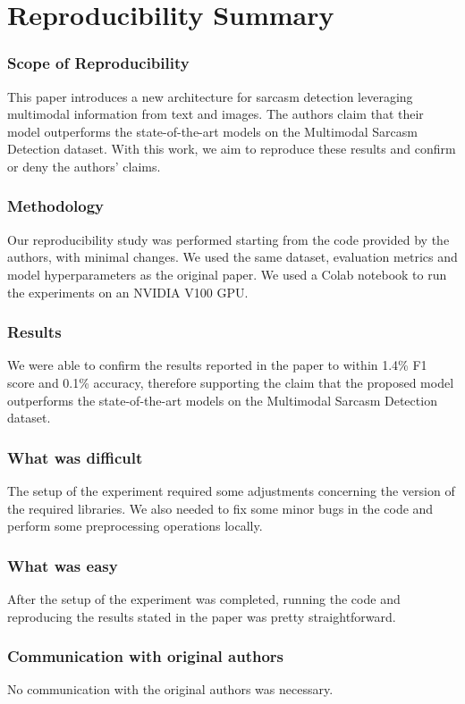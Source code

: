 \section*{\centering Reproducibility Summary}

\subsubsection*{Scope of Reproducibility}
This paper introduces a new architecture for sarcasm detection leveraging multimodal information from text and images. The authors claim that their model outperforms the state-of-the-art models on the Multimodal Sarcasm Detection dataset. With this work, we aim to reproduce these results and confirm or deny the authors' claims.

\subsubsection*{Methodology}
Our reproducibility study was performed starting from the code provided by the authors, with minimal changes. We used the same dataset, evaluation metrics and model hyperparameters as the original paper. We used a Colab notebook to run the experiments on an NVIDIA V100 GPU.

\subsubsection*{Results}
We were able to confirm the results reported in the paper to within 1.4\% F1 score and 0.1\% accuracy, therefore supporting the claim that the proposed model outperforms the state-of-the-art models on the Multimodal Sarcasm Detection dataset. 

\subsubsection*{What was difficult}
The setup of the experiment required some adjustments concerning the version of the required libraries. We also needed to fix some minor bugs in the code and perform some preprocessing operations locally. 

\subsubsection*{What was easy}
After the setup of the experiment was completed, running the code and reproducing the results stated in the paper was pretty straightforward.

\subsubsection*{Communication with original authors}
No communication with the original authors was necessary.
